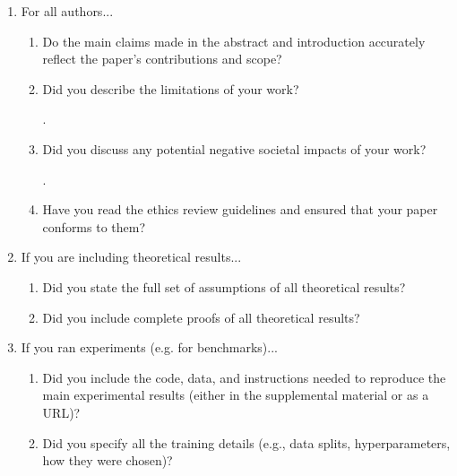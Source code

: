 \newpage
\begin{enumerate}

\item For all authors...
\begin{enumerate}
  \item Do the main claims made in the abstract and introduction accurately reflect the paper's contributions and scope?
    \answerYes{} 
    
  \item Did you describe the limitations of your work?
    \answerYes{} 
    
    .
  \item Did you discuss any potential negative societal impacts of your work?
    \answerYes{} 
    
    .
  \item Have you read the ethics review guidelines and ensured that your paper conforms to them?
    \answerYes{}

\end{enumerate}

\item If you are including theoretical results...
\begin{enumerate}
  \item Did you state the full set of assumptions of all theoretical results?
    \answerNA{}

	\item Did you include complete proofs of all theoretical results?
    \answerNA{}

\end{enumerate}

\item If you ran experiments (e.g. for benchmarks)...
\begin{enumerate}
  \item Did you include the code, data, and instructions needed to reproduce the main experimental results (either in the supplemental material or as a URL)?
    \answerYes{}

  \item Did you specify all the training details (e.g., data splits, hyperparameters, how they were chosen)?
    \answerNA{} 
    

\end{enumerate}
\end{enumerate}
